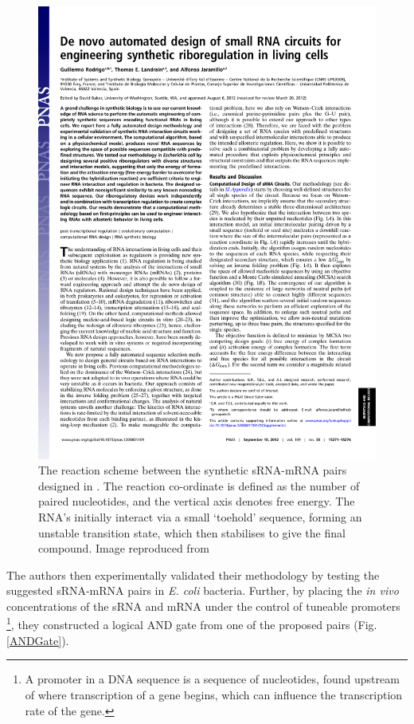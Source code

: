 \documentclass[10pt,journal]{./IEEE_latex_class/IEEEtran}
\begin{document}
\begin{figure}[h]
\centering
\includegraphics[trim = 60 630 300 30,page=2,clip = true]{pnas1203831109.pdf}
\caption{The reaction scheme between the synthetic sRNA-mRNA pairs designed in \cite{Rodrigo2012}. The reaction co-ordinate is defined as the number of paired nucleotides, and the vertical axis denotes free energy. The RNA's initially interact via a small 
`toehold' sequence, forming an unstable transition state, which then stabilises to give the final compound. Image reproduced from \cite{Rodrigo2012}}
\label{reactionscheme}
\end{figure}

The authors then experimentally validated their methodology by testing the suggested sRNA-mRNA pairs in \textit{E. coli} bacteria.  Further, by placing the \textit{in vivo}  concentrations of the sRNA and mRNA under the control of tuneable promoters \footnote{A promoter in a DNA sequence is a sequence of nucleotides, found upstream of where transcription of a gene begins, which can influence the transcription rate of the gene.}, they constructed a logical AND gate from one of the proposed pairs (Fig. \ref{ANDGate}). 
\end{document}
